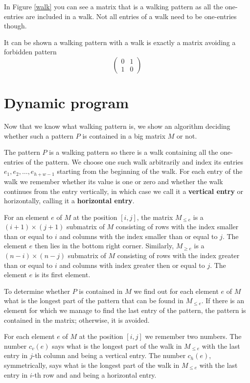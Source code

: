 In Figure \ref{walk} you can see a matrix that is a walking pattern as all the one-entries are included in a walk. Not all entries of a walk need to be one-entries though.

It can be shown a walking pattern with a walk is exactly a matrix avoiding a forbidden pattern
$$\left(\begin{array}{cc}
0 & 1 \\
1 & 0
\end{array}\right)$$

\section{Dynamic program}
Now that we know what walking pattern is, we show an algorithm deciding whether such a pattern $P$ is contained in a big matrix $M$ or not.

The pattern $P$ is a walking pattern so there is a walk containing all the one-entries of the pattern. We choose one such walk arbitrarily and index its entries $e_1,e_2,\dots,e_{h+w-1}$ starting from the beginning of the walk. For each entry of the walk we remember whether its value is one or zero and whether the walk continues from the entry vertically, in which case we call it a \textbf{vertical entry} or horizontally, calling it a \textbf{horizontal entry}.

For an element $e$ of $M$ at the position $[i,j]$, the matrix $M_{\leq e}$ is a $(i+1)\times(j+1)$ submatrix of $M$ consisting of rows with the index smaller than or equal to $i$ and columns with the index smaller than or equal to $j$. The element $e$ then lies in the bottom right corner. Similarly, $M_{\geq e}$ is a $(n-i)\times(n-j)$ submatrix of $M$ consisting of rows with the index greater than or equal to $i$ and columns with index greater then or equal to $j$. The element $e$ is its first element.

To determine whether $P$ is contained in $M$ we find out for each element $e$ of $M$ what is the longest part of the pattern that can be found in $M_{\leq e}$. If there is an element for which we manage to find the last entry of the pattern, the pattern is contained in the matrix; otherwise, it is avoided.

For each element $e$ of $M$ at the position $[i,j]$ we remember two numbers. The number $c_v(e)$ says what is the longest part of the walk in $M_{\leq e}$ with the last entry in $j$-th column and being a vertical entry. The number $c_h(e)$, symmetrically, says what is the longest part of the walk in $M_{\leq e}$ with the last entry in $i$-th row and and being a horizontal entry.

